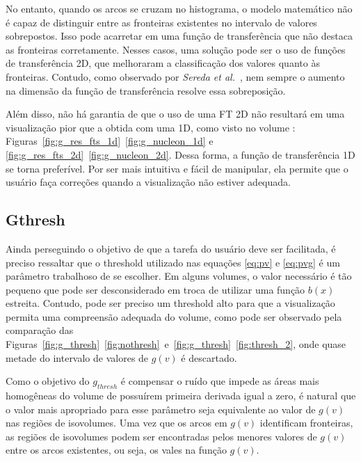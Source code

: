 	No entanto, quando os arcos se cruzam no histograma, o modelo matemático não é capaz de distinguir entre as fronteiras existentes no intervalo de valores sobrepostos. Isso pode acarretar em uma função de transferência que não destaca as fronteiras corretamente. Nesses casos, uma solução pode ser o uso de funções de transferência 2D, que melhoraram a classificação dos valores quanto às fronteiras. Contudo, como observado por \textit{Sereda et al.}~\cite{sereda1}, nem sempre o aumento na dimensão da função de transferência resolve essa sobreposição.
	
	Além disso, não há garantia de que o uso de uma FT 2D não resultará em uma visualização pior que a obtida com uma 1D, como visto no volume : Figuras~\ref{fig:g_res_fts_1d}~\ref{fig:g_nucleon_1d} e \ref{fig:g_res_fts_2d}~\ref{fig:g_nucleon_2d}. Dessa forma, a função de transferência 1D se torna preferível. Por ser mais intuitiva e fácil de manipular, ela permite que o usuário faça correções quando a visualização não estiver adequada.
	
\subsection{Gthresh}
	Ainda perseguindo o objetivo de que a tarefa do usuário deve ser facilitada, é preciso ressaltar que o threshold utilizado nas equações \eqref{eq:pv} e \eqref{eq:pvg} é um parâmetro trabalhoso de se escolher. Em alguns volumes, o valor necessário é tão pequeno que pode ser desconsiderado em troca de utilizar uma função $ b(x) $ estreita. Contudo, pode ser preciso um threshold alto para que a visualização permita uma compreensão adequada do volume, como pode ser observado pela comparação das Figuras~\ref{fig:g_thresh}~\ref{fig:nothresh}~e~\ref{fig:g_thresh}~\ref{fig:thresh_2}, onde quase metade do intervalo de valores de $ g(v) $ é descartado.
	
	Como o objetivo do $ g_{thresh} $ é compensar o ruído que impede as áreas mais homogêneas do volume de possuírem primeira derivada igual a zero, é natural que o valor mais apropriado para esse parâmetro seja equivalente ao valor de $ g(v) $ nas regiões de isovolumes. Uma vez que os arcos em $ g(v) $ identificam fronteiras, as regiões de isovolumes podem ser encontradas pelos menores valores de $ g(v) $ entre os arcos existentes, ou seja, os vales na função $ g(v) $.
	

